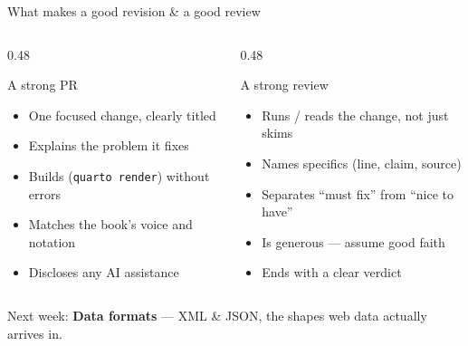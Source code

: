 \documentclass[9pt,aspectratio=169]{beamer}
\begin{document}
\begin{frame}{What makes a good revision \& a good review}
    \begin{columns}[T]
        \begin{column}{0.48\textwidth}
            \begin{block}{A strong PR}
                \begin{itemize}\small
                    \item One focused change, clearly titled
                    \item Explains the problem it fixes
                    \item Builds (\texttt{quarto render}) without errors
                    \item Matches the book's voice and notation
                    \item Discloses any AI assistance
                \end{itemize}
            \end{block}
        \end{column}
        \begin{column}{0.48\textwidth}
            \begin{block}{A strong review}
                \begin{itemize}\small
                    \item Runs / reads the change, not just skims
                    \item Names specifics (line, claim, source)
                    \item Separates ``must fix'' from ``nice to have''
                    \item Is generous --- assume good faith
                    \item Ends with a clear verdict
                \end{itemize}
            \end{block}
        \end{column}
    \end{columns}
    \vspace{0.5em}
    \centering\small Next week: \textbf{Data formats} --- XML \& JSON, the shapes web data actually arrives in.
\end{frame}
\end{document}
